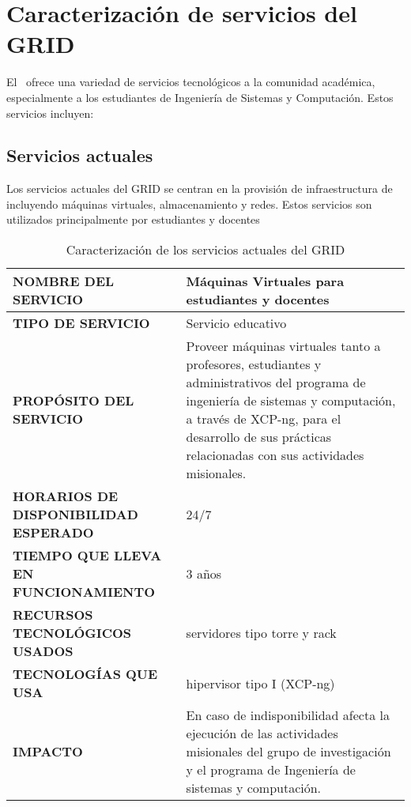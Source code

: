 \section{Caracterización de servicios del GRID}
El \GRID\ ofrece una variedad de servicios tecnológicos a la comunidad académica, especialmente a los estudiantes de Ingeniería de Sistemas y Computación. Estos servicios incluyen:

\subsection{Servicios actuales}
Los servicios actuales del GRID se centran en la provisión de infraestructura de \TI\, incluyendo máquinas virtuales, almacenamiento y redes. Estos servicios son utilizados principalmente por estudiantes y docentes

\begin{table}[H]
\centering
\renewcommand{\arraystretch}{1.5}
\setlength{\tabcolsep}{5pt}
\scriptsize
\begin{tabularx}{\textwidth}{|>{\raggedright\arraybackslash}p{}|X|}
\hline
\textbf{NOMBRE DEL SERVICIO} & Máquinas Virtuales para estudiantes y docentes \\
\hline
\textbf{TIPO DE SERVICIO} & Servicio educativo \\
\hline
\textbf{PROPÓSITO DEL SERVICIO} & Proveer máquinas virtuales tanto a profesores, estudiantes y administrativos del programa de ingeniería de sistemas y computación, a través de XCP-ng, para el desarrollo de sus prácticas relacionadas con sus actividades misionales. \\
\hline
\textbf{HORARIOS DE DISPONIBILIDAD ESPERADO} & 24/7 \\
\hline
\textbf{TIEMPO QUE LLEVA EN FUNCIONAMIENTO} & 3 años \\
\hline
\textbf{RECURSOS TECNOLÓGICOS USADOS} & servidores tipo torre y rack \\
\hline
\textbf{TECNOLOGÍAS QUE USA} & hipervisor tipo I (XCP-ng) \\
\hline
\textbf{IMPACTO} & En caso de indisponibilidad afecta la ejecución de las actividades misionales del grupo de investigación y el programa de Ingeniería de sistemas y computación. \\
\hline
\end{tabularx}
\caption{Caracterización de los servicios actuales del GRID}
\end{table}

